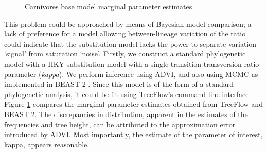 \begin{figure}
    \centering
    \caption{Carnivores base model marginal parameter estimates}
    \label{fig:carnivoresmarginals}
\end{figure}

This problem could be approached by means of Bayesian model comparison; a lack of preference for a model allowing between-lineage variation of the ratio could indicate that the substitution model lacks the power to separate variation `signal' from saturation `noise'. Firstly, we construct a standard phylogenetic model with a HKY substitution model with a single transition-transversion ratio parameter (\textit{kappa}). We perform inference using ADVI, and also using MCMC as implemented in BEAST 2 \cite{bouckaert2019beast}. Since this model is of the form of a standard phylogenetic analysis, it could be fit using TreeFlow's command line interface. Figure \ref{fig:carnivoresmarginals} compares the marginal parameter estimates obtained from TreeFlow and BEAST 2. The discrepancies in distribution, apparent in the estimates of the frequencies and tree height, can be attributed to the approximation error introduced by ADVI. Most importantly, the estimate of the parameter of interest, kappa, appears reasonable.

